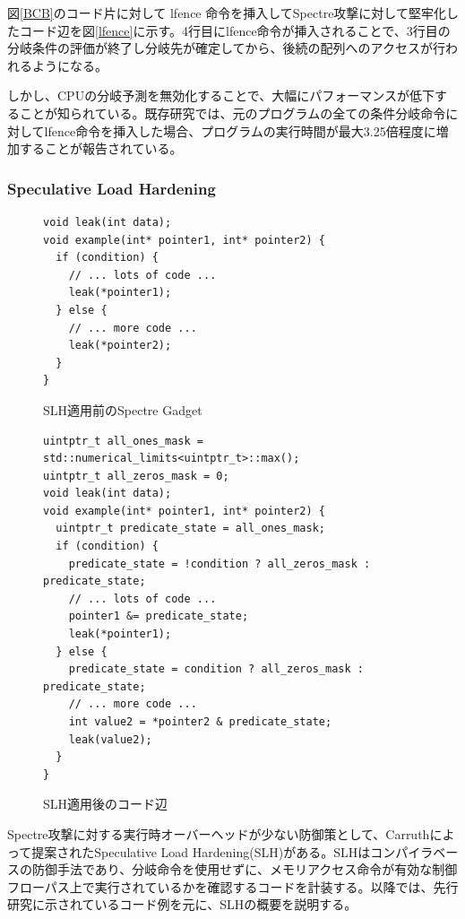 図\ref{BCB}のコード片に対して lfence 命令を挿入してSpectre攻撃に対して堅牢化したコード辺を図\ref{lfence}に示す。4行目にlfence命令が挿入されることで、3行目の分岐条件の評価が終了し分岐先が確定してから、後続の配列へのアクセスが行われるようになる。\par 
しかし、CPUの分岐予測を無効化することで、大幅にパフォーマンスが低下することが知られている。既存研究\cite{wang2018oo7}では、元のプログラムの全ての条件分岐命令に対してlfence命令を挿入した場合、プログラムの実行時間が最大3.25倍程度に増加することが報告されている。

\subsubsection{Speculative Load Hardening}

\begin{figure}
  \begin{verbatim}
void leak(int data);
void example(int* pointer1, int* pointer2) {
  if (condition) {
    // ... lots of code ...
    leak(*pointer1);
  } else {
    // ... more code ...
    leak(*pointer2);
  }
}
\end{verbatim}
  \caption{SLH適用前のSpectre Gadget}
  \label{SLH_before}
\end{figure}

\begin{figure}
  \begin{verbatim}
uintptr_t all_ones_mask = std::numerical_limits<uintptr_t>::max();
uintptr_t all_zeros_mask = 0;
void leak(int data);
void example(int* pointer1, int* pointer2) {
  uintptr_t predicate_state = all_ones_mask;
  if (condition) {
    predicate_state = !condition ? all_zeros_mask : predicate_state;
    // ... lots of code ...
    pointer1 &= predicate_state;
    leak(*pointer1);
  } else {
    predicate_state = condition ? all_zeros_mask : predicate_state;
    // ... more code ...
    int value2 = *pointer2 & predicate_state;
    leak(value2);
  }
}
\end{verbatim}
  \caption{SLH適用後のコード辺}
  \label{SLH_after}
\end{figure}



Spectre攻撃に対する実行時オーバーヘッドが少ない防御策として、Carruthによって提案されたSpeculative Load Hardening(SLH)\cite{LLVM-SLH}がある。SLHはコンパイラベースの防御手法であり、分岐命令を使用せずに、メモリアクセス命令が有効な制御フローパス上で実行されているかを確認するコードを計装する。以降では、先行研究\cite{LLVM-SLH}に示されているコード例を元に、SLHの概要を説明する。\par

